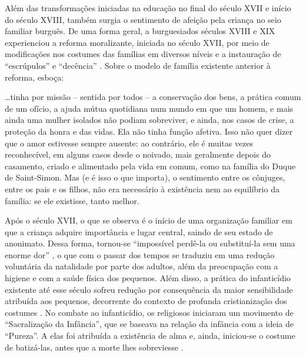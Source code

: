 
Além das transformações iniciadas na educação no final do século XVII e início do século XVIII, também surgia o sentimento de afeição pela criança no seio familiar burguês. De uma forma geral, a burguesia\footnotemark dos séculos XVIII e XIX experienciou a reforma moralizante, iniciada no século XVII, por meio de modificações nos costumes das famílias em diversos níveis e a instauração de ``escrúpulos'' e ``decência'' \cite[p. 77]{ARIES2011}. Sobre o modelo de família existente anterior à reforma,  esboça:

\begin{citacao}
	\ldots tinha por missão -- sentida por todos -- a conservação dos bens, a prática comum de um ofício, a ajuda mútua quotidiana num mundo em que um homem, e mais ainda uma mulher isolados não podiam sobreviver, e ainda, nos casos de crise, a proteção da honra e das vidas. Ela não tinha função afetiva. Isso não quer dizer que o amor estivesse sempre ausente: ao contrário, ele é muitas vezes reconhecível, em alguns casos desde o noivado, mais geralmente depois do casamento, criado e alimentado pela vida em comum, como na família do Duque de Saint-Simon. Mas (e é isso o que importa), o sentimento entre os cônjuges, entre os pais e os filhos, não era necessário à existência nem ao equilíbrio da família: se ele existisse, tanto melhor.
\end{citacao}


Após o século XVII, o que se observa é o início de uma organização familiar em que a criança adquire importância e lugar central, saindo de seu estado de anonimato. Dessa forma, tornou-se ``impossível perdê-la ou substituí-la sem uma enorme dor'' \cite[p. xi]{ARIES2011}, o que com o passar dos tempos se traduziu em uma redução voluntária da natalidade por parte dos adultos, além da preocupação com a higiene e com a saúde física dos pequenos. Além disso, a prática do infanticídio existente até esse século sofreu redução por consequência da maior sensibilidade atribuída aos pequenos, decorrente do contexto de profunda cristianização dos costumes \cite{ARIES2011}. No combate ao infanticídio, os religiosos iniciaram um movimento de ``Sacralização da Infância'', que se baseava na relação da infância com a ideia de ``Pureza''. A elas foi atribuída a existência de alma e, ainda, iniciou-se o costume de batizá-las, antes que a morte lhes sobreviesse \cite[p. 34]{SANTOS1994}.

